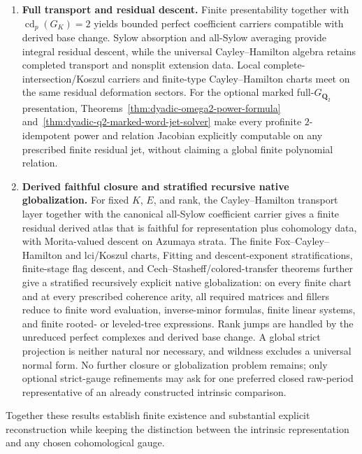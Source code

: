 \documentclass[11pt]{article}
\theoremstyle{definition}
\begin{document}
\begin{enumerate}[label=\textbf{(\arabic*)}]
makes the Bockstein degree shift literal at every $2^n$ level.  Higher Magnus--Fox data and finite relation jets provide explicit finite deformation information when it is needed, without making a chosen presentation intrinsic.

\item \textbf{Full transport and residual descent.}
Finite presentability together with $\operatorname{cd}_p(G_K)=2$ yields bounded perfect coefficient carriers compatible with derived base change.  Sylow absorption and all-Sylow averaging provide integral residual descent, while the universal Cayley--Hamilton algebra retains completed transport and nonsplit extension data.  Local complete-intersection/Koszul carriers and finite-type Cayley--Hamilton charts meet on the same residual deformation sectors.  For the optional marked full-$G_{\mathbf Q_2}$ presentation, Theorems~\ref{thm:dyadic-omega2-power-formula} and~\ref{thm:dyadic-q2-marked-word-jet-solver} make every profinite $2$-idempotent power and relation Jacobian explicitly computable on any prescribed finite residual jet, without claiming a global finite polynomial relation.

\item \textbf{Derived faithful closure and stratified recursive native globalization.}
For fixed $K$, $E$, and rank, the Cayley--Hamilton transport layer together with the canonical all-Sylow coefficient carrier gives a finite residual derived atlas that is faithful for representation plus cohomology data, with Morita-valued descent on Azumaya strata.  The finite Fox--Cayley--Hamilton and lci/Koszul charts, Fitting and descent-exponent stratifications, finite-stage flag descent, and Cech--Stasheff/colored-transfer theorems further give a stratified recursively explicit native globalization: on every finite chart and at every prescribed coherence arity, all required matrices and fillers reduce to finite word evaluation, inverse-minor formulas, finite linear systems, and finite rooted- or leveled-tree expressions.  Rank jumps are handled by the unreduced perfect complexes and derived base change.  A global strict projection is neither natural nor necessary, and wildness excludes a universal normal form.  No further closure or globalization problem remains; only optional strict-gauge refinements may ask for one preferred closed raw-period representative of an already constructed intrinsic comparison.
\end{enumerate}

Together these results establish finite existence and substantial explicit reconstruction while keeping the distinction between the intrinsic representation and any chosen cohomological gauge.
\end{document}
